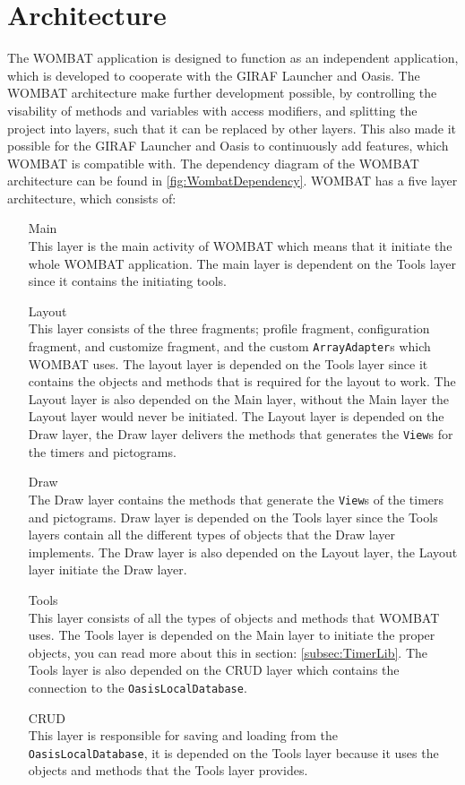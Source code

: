 \section{Architecture}
\label{sec:Architecture}
The WOMBAT application is designed to function as an independent application, which is developed to cooperate with the GIRAF Launcher and Oasis.
The WOMBAT architecture make further development possible, by controlling the visability of methods and variables with access modifiers, and splitting the project into layers, such that it can be replaced by other layers. This also made it possible for the GIRAF Launcher and Oasis to continuously add features, which WOMBAT is compatible with. 
The dependency diagram of the WOMBAT architecture can be found in \autoref{fig:WombatDependency}.
WOMBAT has a five layer architecture, which consists of: 


\begin{itemize}
	\item[Main] \hfill \\	This layer is the main activity of WOMBAT which means that it initiate the whole WOMBAT application. The main layer is dependent on the Tools layer since it contains the initiating tools. 
	\item [Layout] \hfill \\	This layer consists of the three fragments; profile fragment, configuration fragment, and customize fragment, and the custom \texttt{ArrayAdapter}s which WOMBAT uses. The layout layer is depended on the Tools layer since it contains the objects and methods that is required for the layout to work. The Layout layer is also depended on the Main layer, without the Main layer the Layout layer would never be initiated. The Layout layer is depended on the Draw layer, the Draw layer delivers the methods that generates the \texttt{View}s for the timers and pictograms.
	\item [Draw] \hfill \\	The Draw layer contains the methods that generate the \texttt{View}s of the timers and pictograms. Draw layer is depended on the Tools layer since the Tools layers contain all the different types of objects that the Draw layer implements. The Draw layer is also depended on the Layout layer, the Layout layer initiate the Draw layer.
	\item [Tools] \hfill \\	This layer consists of all the types of objects and methods that WOMBAT uses. The Tools layer is depended on the Main layer to initiate the proper objects, you can read more about this in section: \ref{subsec:TimerLib}. The Tools layer is also depended on the CRUD layer which contains the connection to the \texttt{OasisLocalDatabase}.
	\item [CRUD] \hfill \\	This layer is responsible for saving and loading from the \texttt{OasisLocalDatabase}, it is depended on the Tools layer because it uses the objects and methods that the Tools layer provides.
\end{itemize}

